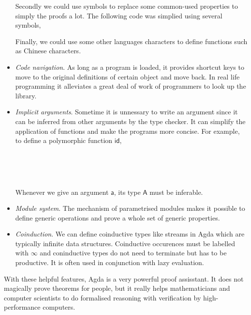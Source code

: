 \begin{itemize}
Secondly we could use symbols to replace some common-used properties to simply the proofs a lot. The following code was simplied using several symbols,


Finally, we could use some other languages characters to define functions such as Chinese characters.

\item \textit{Code navigation}. As long as a program is loaded, it provides shortcut keys to move to the original definitions of certain object and move back. In real life programming it alleviates a great deal of work of programmers to look up the library.

\item \textit{Implicit arguments}. Sometime it is unnessary to write an argument since it can be inferred from other arguments by the type checker. It can simplify the application of functions and make the programs more concise. For example, to define a polymorphic function $\mathsf{id}$,

\begin{code}\>\<%
\\
\> \AgdaSymbol{:} \AgdaSymbol{\{} \AgdaSymbol{:} \AgdaSymbol{\}}    \<%
\\
\>  \AgdaSymbol{=} \<%
\\
\end{code}

Whenever we give an argument $\mathsf{a}$,  its type $\mathsf{A}$ must be inferable.

\item \textit{Module system}. The mechanism of parametrised modules makes it possible to define generic operations and prove a whole set of generic properties.

\item \textit{Coinduction}. We can define coinductive types like streams in Agda which are typically infinite data structures. Coinductive occurences must be labelled with $\infty$ and coninductive types do not need to terminate but has to be productive. It is often used in conjunction with lazy evaluation. \cite{wiki:Coinduction}
	
\end{itemize} 

With these helpful features, Agda is a very powerful proof assisstant. It does not magically prove theorems for people, but it really helps mathematicians and computer scientists to do formalised reasoning with verification by high-performance computers. 


